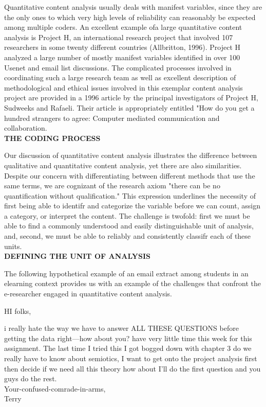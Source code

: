 \documentclass{book}
\begin{document}
Quantitative content analysis usually deals with manifest variables, since they are the only ones to which very high levels of reliability can reasonably be expected among multiple coders. An excellent example ofa large quantitative content analysis is Project H, an international research project that involved 107 researchers in some twenty different countries (Allbritton, 1996). Project H analyzed a large number of mostly manifest variables identified in over 100 Usenet and email list discussions. The complicated processes involved in coordinating such a large research team as well as excellent description of methodological and ethical issues involved in this exemplar content analysis project are provided in a 1996 article by the principal investigators of Project H, Sudweeks and Rafaeli. Their article is appropriately entitled "How do you get a hundred strangers to agree: Computer mediated communication and collaboration.\\
\textbf{THE CODING PROCESS}\par
 Our discussion of quantitative content analysis illustrates the difference between qualitative and quantitative content analysis, yet there are also similarities. Despite our concern with differentiating between different methods that use the same terms, we are cognizant of the research axiom "there can be no quantification without qualification." This expression underlines the necessity of first being able to identifr and categorize the variable before we can count, assign a category, or interpret the content. The challenge is twofold: first we must be able to find a commonly understood and easily distinguishable unit of analysis, and, second, we must be able to reliably and consistently classifr each of these units.\\
\textbf{DEFINING THE UNIT OF ANALYSIS}  \par
The following hypothetical example of an email extract among students in an elearning context provides us with an example of the challenges that confront the e-researcher engaged in quantitative content analysis.
\begin{center}
HI folks,
\end{center}
\par
 i really hate the way we have to answer ALL THESE QUESTIONS before getting the data right—how about you? have very little time this week for this assignment. The last time I tried this I got bogged down with chapter 3 do we really have to know about semiotics, I want to get onto the project analysis first then decide if we need all this theory how about I'll do the first question and you guys do the rest.\\ Your-confused-comrade-in-arms,\\ Terry
\end{document}
